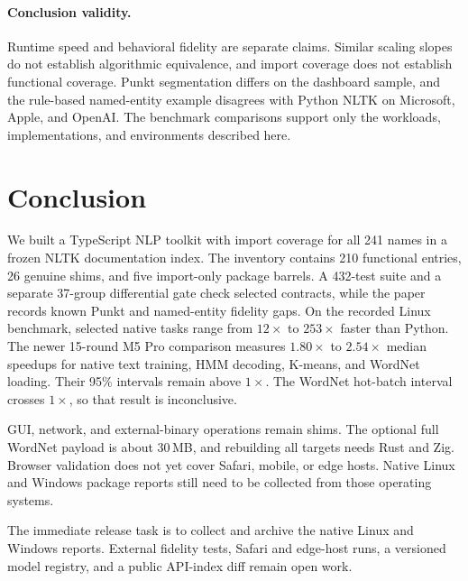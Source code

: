 \documentclass[pdflatex,sn-mathphys-num]{sn-jnl}
\theoremstyle{thmstyleone}
\begin{document}
\paragraph{Conclusion validity.}
Runtime speed and behavioral fidelity are separate claims. Similar scaling slopes do not establish algorithmic equivalence, and import coverage does not establish functional coverage. Punkt segmentation differs on the dashboard sample, and the rule-based named-entity example disagrees with Python NLTK on Microsoft, Apple, and OpenAI. The benchmark comparisons support only the workloads, implementations, and environments described here.

\section{Conclusion}\label{sec:conclusion}

We built a TypeScript NLP toolkit with import coverage for all 241 names in a frozen NLTK documentation index. The inventory contains 210 functional entries, 26 genuine shims, and five import-only package barrels. A 432-test suite and a separate 37-group differential gate check selected contracts, while the paper records known Punkt and named-entity fidelity gaps. On the recorded Linux benchmark, selected native tasks range from $12\times$ to $253\times$ faster than Python. The newer 15-round M5 Pro comparison measures $1.80\times$ to $2.54\times$ median speedups for native text training, HMM decoding, K-means, and WordNet loading. Their 95\% intervals remain above $1\times$. The WordNet hot-batch interval crosses $1\times$, so that result is inconclusive.

GUI, network, and external-binary operations remain shims. The optional full WordNet payload is about 30\,MB, and rebuilding all targets needs Rust and Zig. Browser validation does not yet cover Safari, mobile, or edge hosts. Native Linux and Windows package reports still need to be collected from those operating systems.

The immediate release task is to collect and archive the native Linux and Windows reports. External fidelity tests, Safari and edge-host runs, a versioned model registry, and a public API-index diff remain open work.
\end{document}
